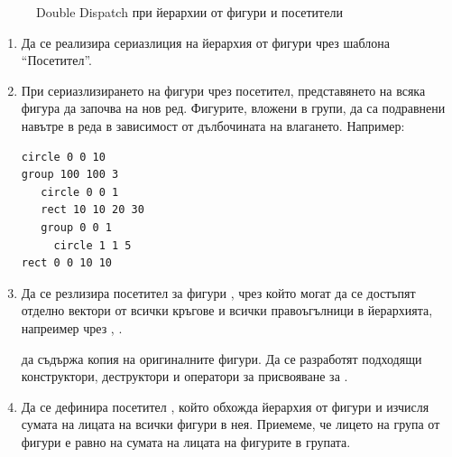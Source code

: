 \begin{figure}
  
  \caption{Double Dispatch при йерархии от фигури и посетители}
  \label{fig:visitor}
  \end{figure}  


\begin{enumerate}[resume]
  \item Да се реализира сериазлиция на йерархия от фигури чрез шаблона ``Посетител''.
  \item При сериазлизирането на фигури чрез посетител, представянето на всяка фигура да започва на нов ред. Фигурите, вложени в групи, да са подравнени навътре в реда в зависимост от дълбочината на влагането. Например:
\begin{verbatim}
circle 0 0 10
group 100 100 3
   circle 0 0 1
   rect 10 10 20 30
   group 0 0 1
     circle 1 1 5
rect 0 0 10 10 
\end{verbatim}
  \item Да се резлизира посетител за фигури , чрез който могат да се достъпят отделно вектори от всички кръгове и всички правоъгълници в йерархията, напреимер чрез , .
  
   да съдържа копия на оригиналните фигури. Да се разработят подходящи конструктори, деструктори и оператори за присвояване за .
  \item Да се дефинира посетител , който обхожда йерархия от фигури и изчисля сумата на лицата на всички фигури в нея. Приемеме, че лицето на група от фигури е равно на сумата на лицата на фигурите в групата.
  
\end{enumerate}

\pagebreak

